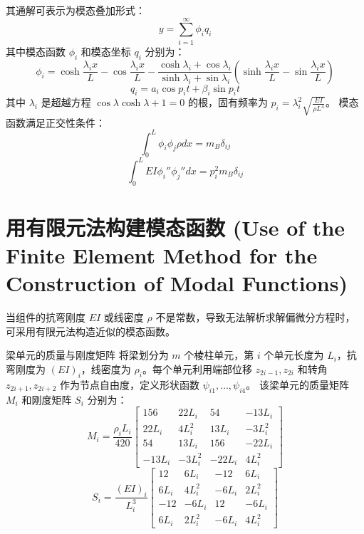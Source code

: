 其通解可表示为模态叠加形式：
\begin{equation}
y = \sum_{i=1}^{\infty} \phi_i q_i \tag{3}
\end{equation}
其中模态函数 \(\phi_i\) 和模态坐标 \(q_i\) 分别为：
\begin{equation}
\phi_i = \cosh\frac{\lambda_i x}{L} - \cos\frac{\lambda_i x}{L} - \frac{\cosh\lambda_i + \cos\lambda_i}{\sinh\lambda_i + \sin\lambda_i}\left( \sinh\frac{\lambda_i x}{L} - \sin\frac{\lambda_i x}{L} \right) \tag{4}
\end{equation}
\begin{equation}
q_i = a_i \cos p_i t + \beta_i \sin p_i t \tag{5}
\end{equation}
其中 \(\lambda_i\) 是超越方程 \(\cos\lambda \cosh\lambda + 1 = 0\) 的根，固有频率为 \(p_i = \lambda_i^2 \sqrt{\frac{EI}{\rho L^4}}\)。
模态函数满足正交性条件：
\begin{equation}
\int_0^L \phi_i \phi_j \rho dx = m_B \delta_{ij} \tag{8}
\end{equation}
\begin{equation}
\int_0^L EI \phi_i'' \phi_j'' dx = p_i^2 m_B \delta_{ij} \tag{9}
\end{equation}

\section{用有限元法构建模态函数 (Use of the Finite Element Method for the Construction of Modal Functions)}

当组件的抗弯刚度 \(EI\) 或线密度 \(\rho\) 不是常数，导致无法解析求解偏微分方程时，可采用有限元法构造近似的模态函数。

\begin{mydefinition}{梁单元的质量与刚度矩阵}
将梁划分为 \(m\) 个棱柱单元，第 \(i\) 个单元长度为 \(L_i\)，抗弯刚度为 \((EI)_i\)，线密度为 \(\rho_i\)。每个单元利用端部位移 \(z_{2i-1}, z_{2i}\) 和转角 \(z_{2i+1}, z_{2i+2}\) 作为节点自由度，定义形状函数 \(\psi_{i1},\dots,\psi_{i4}\)。
该梁单元的质量矩阵 \(M_i\) 和刚度矩阵 \(S_i\) 分别为：
\begin{equation}
M_i = \frac{\rho_i L_i}{420}\begin{bmatrix} 156 & 22L_i & 54 & -13L_i \\ 22L_i & 4L_i^2 & 13L_i & -3L_i^2 \\ 54 & 13L_i & 156 & -22L_i \\ -13L_i & -3L_i^2 & -22L_i & 4L_i^2 \end{bmatrix} \tag{12}
\end{equation}
\begin{equation}
S_i = \frac{(EI)_i}{L_i^3}\begin{bmatrix} 12 & 6L_i & -12 & 6L_i \\ 6L_i & 4L_i^2 & -6L_i & 2L_i^2 \\ -12 & -6L_i & 12 & -6L_i \\ 6L_i & 2L_i^2 & -6L_i & 4L_i^2 \end{bmatrix} \tag{13}
\end{equation}
\end{mydefinition}

